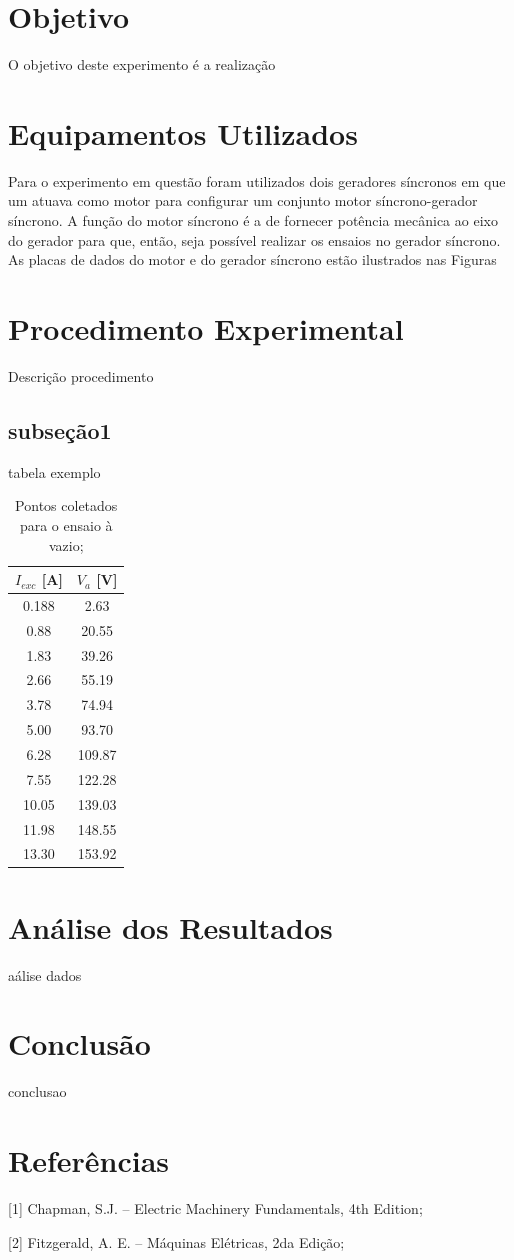 \documentclass[a4paper, 12pt]{article}
\begin{document}
\section{Objetivo}

O objetivo deste experimento é a realização 
\section{Equipamentos Utilizados}

Para o experimento em questão foram utilizados dois geradores síncronos em que um atuava como motor para configurar um conjunto motor síncrono-gerador síncrono. A função do motor síncrono é a de fornecer potência mecânica ao eixo do gerador para que, então, seja possível realizar os ensaios no gerador síncrono. As placas de dados do motor e do gerador síncrono estão ilustrados nas Figuras 

\section{Procedimento Experimental}

Descrição procedimento

\subsection{subseção1}

tabela exemplo

\begin{table}[htb]
\centering
\begin{tabular}{c|c}
$I_{exc}$ [A] & $V_{a}$ [V] \\ \hline
0.188	& 2.63 		\\\hline
0.88 & 20.55	\\\hline
1.83 & 39.26 \\\hline
2.66 & 55.19 \\\hline
3.78 & 74.94 \\\hline
5.00 & 93.70 \\\hline
6.28 & 109.87 \\\hline
7.55 & 122.28 \\\hline
10.05 & 139.03 \\\hline
11.98 & 148.55 \\\hline
13.30 & 153.92 
\end{tabular}
\caption{Pontos coletados para o ensaio à vazio;}
\label{vazio}
\end{table}



\section{Análise dos Resultados}


aálise dados
\section{Conclusão}

conclusao



\newpage
\section{Referências}

[1] Chapman, S.J. -- Electric Machinery Fundamentals, 4th Edition;

[2] Fitzgerald, A. E. -- Máquinas Elétricas, 2da Edição;
\end{document}
